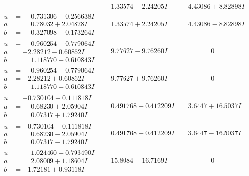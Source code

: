 \documentclass[1p]{elsarticle_modified}
\theoremstyle{definition}
\begin{document}
$$\begin{array}{c|c|c}
 & \phantom{-}1.33574 - 2.24205 I & \phantom{-}4.43086 + 8.82898 I \\ \hline\begin{aligned}
u &= \phantom{-}0.731306 - 0.256638 I \\
a &= \phantom{-}0.78032 + 2.04828 I \\
b &= \phantom{-}0.327098 + 0.173264 I\end{aligned}
 & \phantom{-}1.33574 + 2.24205 I & \phantom{-}4.43086 - 8.82898 I \\ \hline\begin{aligned}
u &= \phantom{-}0.960254 + 0.779064 I \\
a &= -2.28212 - 0.60862 I \\
b &= \phantom{-}1.118770 - 0.610843 I\end{aligned}
 & \phantom{-}9.77627 - 9.76260 I & \phantom{-0.000000 } 0 \\ \hline\begin{aligned}
u &= \phantom{-}0.960254 - 0.779064 I \\
a &= -2.28212 + 0.60862 I \\
b &= \phantom{-}1.118770 + 0.610843 I\end{aligned}
 & \phantom{-}9.77627 + 9.76260 I & \phantom{-0.000000 } 0 \\ \hline\begin{aligned}
u &= -0.730104 + 0.111818 I \\
a &= \phantom{-}0.68230 + 2.05904 I \\
b &= \phantom{-}0.07317 + 1.79240 I\end{aligned}
 & \phantom{-}0.491768 + 0.412209 I & \phantom{-}3.6447 + 16.5037 I \\ \hline\begin{aligned}
u &= -0.730104 - 0.111818 I \\
a &= \phantom{-}0.68230 - 2.05904 I \\
b &= \phantom{-}0.07317 - 1.79240 I\end{aligned}
 & \phantom{-}0.491768 - 0.412209 I & \phantom{-}3.6447 - 16.5037 I \\ \hline\begin{aligned}
u &= \phantom{-}1.024460 + 0.793490 I \\
a &= \phantom{-}2.08009 + 1.18604 I \\
b &= -1.72181 + 0.93118 I\end{aligned}
 & \phantom{-}15.8084 - 16.7169 I & \phantom{-0.000000 } 0 \\ \hline\begin{aligned}

\end{aligned}
\end{array}$$
\end{document}
